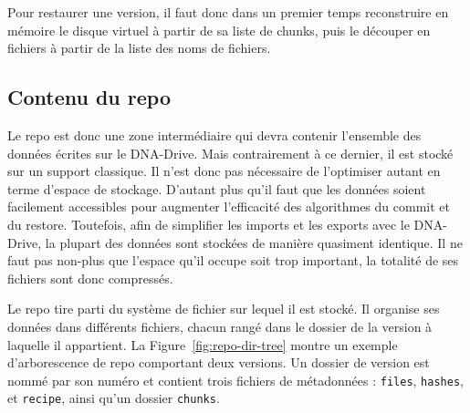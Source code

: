 \documentclass[a4paper]{report}
\begin{document}
Pour restaurer une version, il faut donc dans un premier temps
reconstruire en mémoire le disque virtuel à partir de sa liste de chunks,
puis le découper en fichiers à partir de la liste des noms de fichiers.


\subsection{Contenu du repo}

Le repo est donc une zone intermédiaire qui devra contenir l'ensemble des données écrites sur le DNA-Drive.
Mais contrairement à ce dernier, il est stocké sur un support classique.
Il n'est donc pas nécessaire de l'optimiser autant en terme d'espace de stockage.
D'autant plus qu'il faut que les données soient facilement accessibles
pour augmenter l'efficacité des algorithmes du commit et du restore.
Toutefois, afin de simplifier les imports et les exports avec le DNA-Drive,
la plupart des données sont stockées de manière quasiment identique.
Il ne faut pas non-plus que l'espace qu'il occupe soit trop important,
la totalité de ses fichiers sont donc compressés.

Le repo tire parti du système de fichier sur lequel il est stocké.
Il organise ses données dans différents fichiers,
chacun rangé dans le dossier de la version à laquelle il appartient.
La Figure~\ref{fig:repo-dir-tree} montre un exemple d'arborescence de repo comportant deux versions.
Un dossier de version est nommé par son numéro et contient trois fichiers de métadonnées :
\verb|files|, \verb|hashes|, et \verb|recipe|, ainsi qu'un dossier \verb|chunks|.
\end{document}
